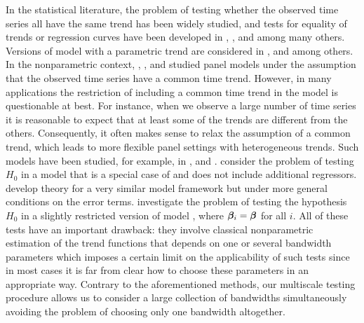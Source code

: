 \documentclass[a4paper,12pt]{article}
\makeatletter
\renewcommand{\eqref}[1]{\tagform@{\ref{#1}}}
\makeatother
\begin{document}
In the statistical literature, the problem of testing whether the observed time series all have the same trend  has been widely studied, and tests for equality of trends or regression curves have been developed in \cite{HaerdleMarron1990}, \cite{Hall1990}, \linebreak \cite{Delgado1993} and \cite{DegrasWu2012} among many others. Versions of model \eqref{eq:model} with a parametric trend are considered in \cite{Vogelsang2005}, \cite{Sun2011} and \cite{Xu2012} among others. In the nonparametric context, \cite{LiChenGao2010}, \cite{Atak2011}, \cite{Robinson2012} and \cite{ChenGaoLi2012} studied panel models under the assumption that the observed time series have a common time trend. However, in many applications the restriction of including a common time trend in the model is questionable at best. For instance, when we observe a large number of time series it is reasonable to expect that at least some of the trends are different from the others. Consequently, it often makes sense to relax the assumption of a common trend, which leads to more flexible panel settings with heterogeneous trends. Such models have been studied, for example, in \cite{DegrasWu2012},  \cite{Zhang2012} and \cite{Hidalgo2014}. \cite{DegrasWu2012} consider the problem of testing $H_0$ in a model that is a special case of \eqref{eq:model} and does not include additional regressors. \cite{ChenWu2018} develop theory for a very similar model framework but under more general conditions on the error terms. \linebreak \cite{Zhang2012} investigate the problem of testing the hypothesis $H_0$ in a slightly restricted version of model \eqref{eq:model}, where $\bm{\beta}_i = \bm{\beta}$ for all $i$. All of these tests have an important drawback: they involve classical nonparametric estimation of the trend functions that depends on one or several bandwidth parameters which imposes a certain limit on the applicability of such tests since in most cases it is far from clear how to choose these parameters in an appropriate way. Contrary to the aforementioned methods, our multiscale testing procedure allows us to consider a large collection of bandwidths simultaneously avoiding the problem of choosing only one bandwidth altogether.
\end{document}
